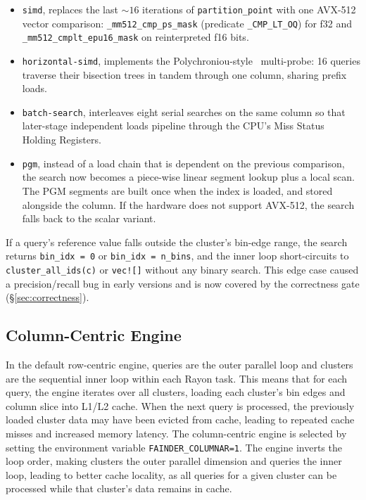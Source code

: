 \begin{itemize}
    \item \texttt{simd}, replaces the last $\sim\!16$ iterations of \texttt{partition\_point} with one AVX-512 vector comparison: \texttt{\_mm512\_cmp\_ps\_mask} (predicate \texttt{\_CMP\_LT\_OQ}) for f32 and \texttt{\_mm512\_cmplt\_epu16\_mask} on reinterpreted f16 bits.
    \item \texttt{horizontal-simd}, implements the Polychroniou-style~\cite{polychroniou_2014} multi-probe: 16 queries traverse their bisection trees in tandem through one column, sharing prefix loads.
    \item \texttt{batch-search}, interleaves eight serial searches on the same column so that later-stage independent loads pipeline through the CPU's Miss Status Holding Registers.
    \item \texttt{pgm}, instead of a load chain that is dependent on the previous comparison, the search now becomes a piece-wise linear segment lookup plus a local scan. The PGM segments are built once when the index is loaded, and stored alongside the column. If the hardware does not support AVX-512, the search falls back to the scalar variant.
\end{itemize}

If a query's reference value falls outside the cluster's bin-edge range, the search returns \texttt{bin\_idx = 0} or \texttt{bin\_idx = n\_bins}, and the inner loop short-circuits to \texttt{cluster\_all\_ids(c)} or \texttt{vec![]} without any binary search. This edge case caused a precision/recall bug in early versions and is now covered by the correctness gate (§\ref{sec:correctness}).

\subsection{Column-Centric Engine\label{sec:method:impl:columnar}}

In the default row-centric engine, queries are the outer parallel loop and clusters are the sequential inner loop within each Rayon task. This means that for each query, the engine iterates over all clusters, loading each cluster's bin edges and column slice into L1/L2 cache. When the next query is processed, the previously loaded cluster data may have been evicted from cache, leading to repeated cache misses and increased memory latency. The column-centric engine is selected by setting the environment variable \texttt{FAINDER\_COLUMNAR=1}. The engine inverts the loop order, making clusters the outer parallel dimension and queries the inner loop, leading to better cache locality, as all queries for a given cluster can be processed while that cluster's data remains in cache.

